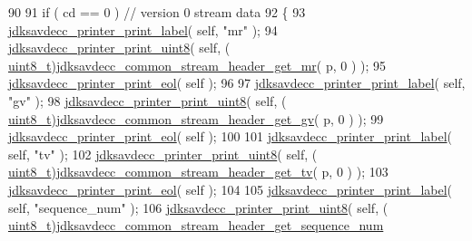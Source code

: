 \begin{DoxyCode}
90 
91             \textcolor{keywordflow}{if} ( cd == 0 ) \textcolor{comment}{// version 0 stream data}
92             \{
93                 \hyperlink{group__util_gaf7818b24143b3c7502926a425a242ff5}{jdksavdecc\_printer\_print\_label}( \textcolor{keyword}{self}, \textcolor{stringliteral}{"mr"} );
94                 \hyperlink{group__util_ga00205f7730fc39a5b93655a3b18a8dc7}{jdksavdecc\_printer\_print\_uint8}( \textcolor{keyword}{self}, (
      \hyperlink{stdint_8h_aba7bc1797add20fe3efdf37ced1182c5}{uint8\_t})\hyperlink{group__jdksavdecc__avtp__common__stream__header_ga1078bf7435e2f2d588ff62763fb2253d}{jdksavdecc\_common\_stream\_header\_get\_mr}( p, 0 ) );
95                 \hyperlink{group__util_gacda56c9d3d24593a52c999682fa6e6e3}{jdksavdecc\_printer\_print\_eol}( \textcolor{keyword}{self} );
96 
97                 \hyperlink{group__util_gaf7818b24143b3c7502926a425a242ff5}{jdksavdecc\_printer\_print\_label}( \textcolor{keyword}{self}, \textcolor{stringliteral}{"gv"} );
98                 \hyperlink{group__util_ga00205f7730fc39a5b93655a3b18a8dc7}{jdksavdecc\_printer\_print\_uint8}( \textcolor{keyword}{self}, (
      \hyperlink{stdint_8h_aba7bc1797add20fe3efdf37ced1182c5}{uint8\_t})\hyperlink{group__jdksavdecc__avtp__common__stream__header_gaa6e6902759830178dd869a3ea8d16202}{jdksavdecc\_common\_stream\_header\_get\_gv}( p, 0 ) );
99                 \hyperlink{group__util_gacda56c9d3d24593a52c999682fa6e6e3}{jdksavdecc\_printer\_print\_eol}( \textcolor{keyword}{self} );
100 
101                 \hyperlink{group__util_gaf7818b24143b3c7502926a425a242ff5}{jdksavdecc\_printer\_print\_label}( \textcolor{keyword}{self}, \textcolor{stringliteral}{"tv"} );
102                 \hyperlink{group__util_ga00205f7730fc39a5b93655a3b18a8dc7}{jdksavdecc\_printer\_print\_uint8}( \textcolor{keyword}{self}, (
      \hyperlink{stdint_8h_aba7bc1797add20fe3efdf37ced1182c5}{uint8\_t})\hyperlink{group__jdksavdecc__avtp__common__stream__header_gae93f42ff954571137306bc5d7347b087}{jdksavdecc\_common\_stream\_header\_get\_tv}( p, 0 ) );
103                 \hyperlink{group__util_gacda56c9d3d24593a52c999682fa6e6e3}{jdksavdecc\_printer\_print\_eol}( \textcolor{keyword}{self} );
104 
105                 \hyperlink{group__util_gaf7818b24143b3c7502926a425a242ff5}{jdksavdecc\_printer\_print\_label}( \textcolor{keyword}{self}, \textcolor{stringliteral}{"sequence\_num"} );
106                 \hyperlink{group__util_ga00205f7730fc39a5b93655a3b18a8dc7}{jdksavdecc\_printer\_print\_uint8}( \textcolor{keyword}{self}, (
      \hyperlink{stdint_8h_aba7bc1797add20fe3efdf37ced1182c5}{uint8\_t})\hyperlink{group__jdksavdecc__avtp__common__stream__header_gadaa25243226bcdb06fecd9aa768d24fb}{jdksavdecc\_common\_stream\_header\_get\_sequence\_num}

\end{DoxyCode}
